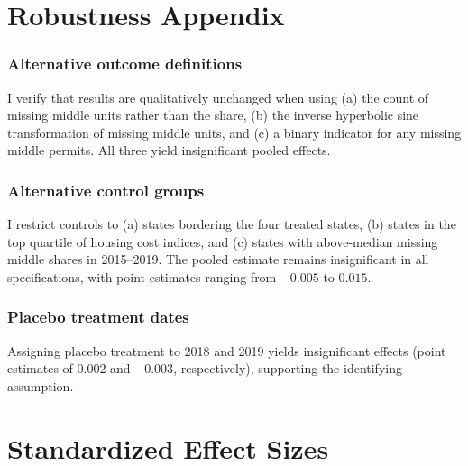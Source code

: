 \documentclass[12pt]{article}
\begin{document}
\section{Robustness Appendix}
\label{app:robustness}

\subsubsection*{Alternative outcome definitions} I verify that results are qualitatively unchanged when using (a) the count of missing middle units rather than the share, (b) the inverse hyperbolic sine transformation of missing middle units, and (c) a binary indicator for any missing middle permits. All three yield insignificant pooled effects.

\subsubsection*{Alternative control groups} I restrict controls to (a) states bordering the four treated states, (b) states in the top quartile of housing cost indices, and (c) states with above-median missing middle shares in 2015--2019. The pooled estimate remains insignificant in all specifications, with point estimates ranging from $-0.005$ to $0.015$.

\subsubsection*{Placebo treatment dates} Assigning placebo treatment to 2018 and 2019 yields insignificant effects (point estimates of 0.002 and $-0.003$, respectively), supporting the identifying assumption.


\section{Standardized Effect Sizes}
\label{sec:sde}


\end{document}

